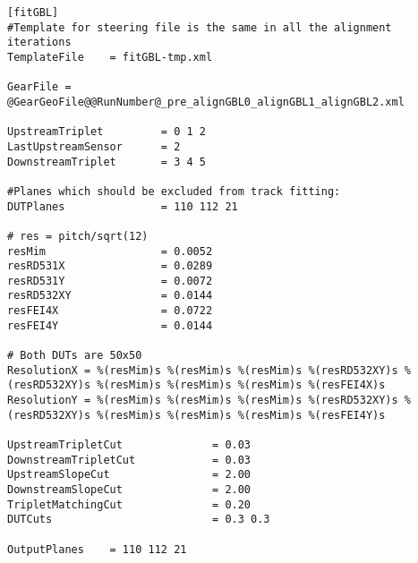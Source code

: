 \begin{lstlisting}[caption={Configuration file of EUTelescope for the testbeam anaylsis of June 2020 Batch 3}]
[fitGBL]
#Template for steering file is the same in all the alignment iterations
TemplateFile    = fitGBL-tmp.xml

GearFile = @GearGeoFile@@RunNumber@_pre_alignGBL0_alignGBL1_alignGBL2.xml

UpstreamTriplet         = 0 1 2
LastUpstreamSensor      = 2
DownstreamTriplet       = 3 4 5

#Planes which should be excluded from track fitting:
DUTPlanes               = 110 112 21

# res = pitch/sqrt(12)
resMim                  = 0.0052
resRD531X               = 0.0289
resRD531Y               = 0.0072
resRD532XY              = 0.0144
resFEI4X                = 0.0722
resFEI4Y                = 0.0144

# Both DUTs are 50x50
ResolutionX = %(resMim)s %(resMim)s %(resMim)s %(resRD532XY)s %(resRD532XY)s %(resMim)s %(resMim)s %(resMim)s %(resFEI4X)s
ResolutionY = %(resMim)s %(resMim)s %(resMim)s %(resRD532XY)s %(resRD532XY)s %(resMim)s %(resMim)s %(resMim)s %(resFEI4Y)s

UpstreamTripletCut              = 0.03
DownstreamTripletCut            = 0.03
UpstreamSlopeCut                = 2.00
DownstreamSlopeCut              = 2.00
TripletMatchingCut              = 0.20
DUTCuts                         = 0.3 0.3

OutputPlanes    = 110 112 21
\end{lstlisting}
